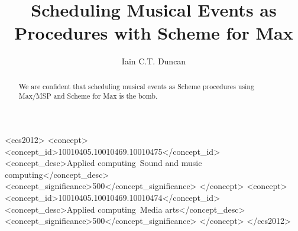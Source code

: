\documentclass[acmsmall]{acmart}
\begin{document}
\title{Scheduling Musical Events as Procedures with Scheme for Max}

\author{Iain C.T. Duncan}


\renewcommand{\shortauthors}{Duncan}

\begin{abstract}
  We are confident that scheduling musical events as
  Scheme procedures using Max/MSP and Scheme for Max is the bomb.
\end{abstract}


\begin{CCSXML}
<ccs2012>
<concept>
<concept_id>10010405.10010469.10010475</concept_id>
<concept_desc>Applied computing~Sound and music computing</concept_desc>
<concept_significance>500</concept_significance>
</concept>
<concept>
<concept_id>10010405.10010469.10010474</concept_id>
<concept_desc>Applied computing~Media arts</concept_desc>
<concept_significance>500</concept_significance>
</concept>
</ccs2012>
\end{CCSXML}

\end{document}
